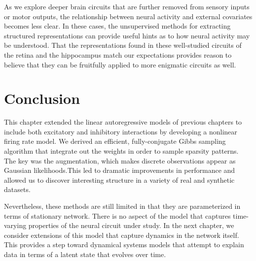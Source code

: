 As we explore deeper brain circuits that are further removed from
sensory inputs or motor outputs, the relationship between neural activity
and external covariates becomes less clear. In these cases, the unsupervised
methods for extracting structured representations can provide useful
hints as to how neural activity may be understood. That the representations
found in these well-studied circuits of the retina and the hippocampus
match our expectations provides reason to believe that they can be
fruitfully applied to more enigmatic circuits as well.

\section{Conclusion}
This chapter extended the linear autoregressive models of previous
chapters to include both excitatory and inhibitory interactions by
developing a nonlinear firing rate model.  We derived an efficient,
fully-conjugate Gibbs sampling algorithm that integrate out the
weights in order to sample sparsity patterns. The key was the
\polyagamma augmentation, which makes discrete observations appear as
Gaussian likelihoods.This led to dramatic improvements in performance
and allowed us to discover interesting structure in a variety of real
and synthetic datasets.

Nevertheless, these methods are still limited in that they are
parameterized in terms of stationary network. There is no aspect of
the model that captures time-varying properties of the neural circuit under
study. In the next chapter, we consider extensions of this model that
capture dynamics in the network itself. This provides a step toward
dynamical systems models that attempt to explain data in terms of a
latent state that evolves over time.
